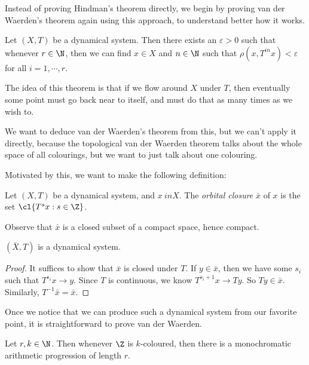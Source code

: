 \documentclass[a4paper]{article}
\begin{document}
Instead of proving Hindman's theorem directly, we begin by proving van der Waerden's theorem again using this approach, to understand better how it works.

\begin{thm}
  Let $(X, T)$ be a dynamical system. Then there exists an $\varepsilon > 0$ such that whenever $r \in\N$, then we can find $x \in X$ and $n \in \N$ such that $\rho(x, T^{in} x) < \varepsilon$ for all $i = 1, \cdots, r$.
\end{thm}
The idea of this theorem is that if we flow around $X$ under $T$, then eventually some point must go back near to itself, and must do that as many times as we wish to.

We want to deduce van der Waerden's theorem from this, but we can't apply it directly, because the topological van der Waerden theorem talks about the whole space of all colourings, but we want to just talk about one colouring.

Motivated by this, we want to make the following definition:
\begin{defi}
  Let $(X, T)$ be a dynamical system, and $x\ in X$. The \emph{orbital closure} $\bar{x}$ of $x$ is the set $\cl \{T^s x: s \in \Z\}$.
\end{defi}
Observe that $\bar{x}$ is a closed subset of a compact space, hence compact.

\begin{prop}
  $(\bar{X}, T)$ is a dynamical system.
\end{prop}

\begin{proof}
  It suffices to show that $\bar{x}$ is closed under $T$. If $y \in \bar{x}$, then we have some $s_i$ such that $T^{s_i}x \to y$. Since $T$ is continuous, we know $T^{s_i + 1}x \to T y$. So $T y \in \bar{x}$. Similarly, $T^{-1}\bar{x} = \bar{x}$.
\end{proof}

Once we notice that we can produce such a dynamical system from our favorite point, it is straightforward to prove van der Waerden.
\begin{cor}
  Let $r, k \in \N$. Then whenever $\Z$ is $k$-coloured, then there is a monochromatic arithmetic progression of length $r$.
\end{cor}
\end{document}

